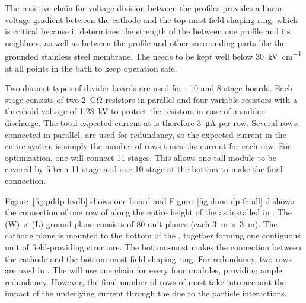 The resistive chain for voltage division between the profiles provides a linear voltage gradient between the cathode and the top-most field shaping ring, which is critical because it determines the strength of the \efield between one profile and its neighbors, as well as between the profile and other surrounding parts like the grounded stainless steel membrane. The \efield needs to be kept well below \SI{30}{\kV\per\cm} at all points in the \lar bath to keep  operation safe.


Two distinct types of  divider boards are used for : \num{10} and \num{8} stage boards.  Each stage consists of two \SI{2}{\giga\ohm} resistors in parallel and four variable resistors with a threshold voltage of \SI{1.28}{kV} to protect the resistors in case of a sudden discharge.  The total expected current at \dptargetdriftvoltpos is therefore \SI{3}{\micro\ampere} per row.  Several rows, connected in parallel, are used for redundancy, so the expected current in the entire system is simply the number of rows times the current for each row.
For optimization, one   will connect \num{11} stages.  This allows  one \tpcheight tall module to be covered by fifteen \num{11} stage  and one \num{10} stage  at the bottom to make the final connection.  

Figure~\ref{fig:pddp-hvdb} shows one   board and  Figure~\ref{fig:dune-dp-fc-all} d shows the connection of one row of  along the entire height of the  as installed in . The \dptpcwdth (W) $\times$ \dptpclen (L) ground plane consists of \num{80} unit planes (each \SI{3}{\m} $\times$ \SI{3}{\m}).  
The cathode plane is mounted to the bottom of the , together forming one contiguous unit of field-providing structure.  The bottom-most  makes the connection between the cathode and the bottom-most field-shaping ring.
For redundancy, two  rows are used in .  
The \dpmod will use one  chain for every four  modules, providing ample redundancy.  However, the final number of rows of  must take into account the impact of the underlying current through the  due to the particle interactions.

